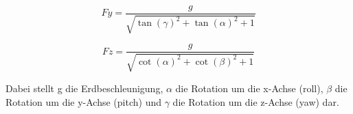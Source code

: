 \begin{equation}
Fy=\frac{g}{\sqrt{\tan(\gamma)^2+\tan(\alpha)^2+1}}
\end{equation}

\begin{equation}
Fz=\frac{g}{\sqrt{\cot(\alpha)^2+\cot(\beta)^2+1}}
\end{equation}

Dabei stellt g die Erdbeschleunigung, $\alpha$ die Rotation um die x-Achse (roll), $\beta$ die Rotation um die y-Achse (pitch) und $\gamma$ die Rotation um die z-Achse (yaw) dar.